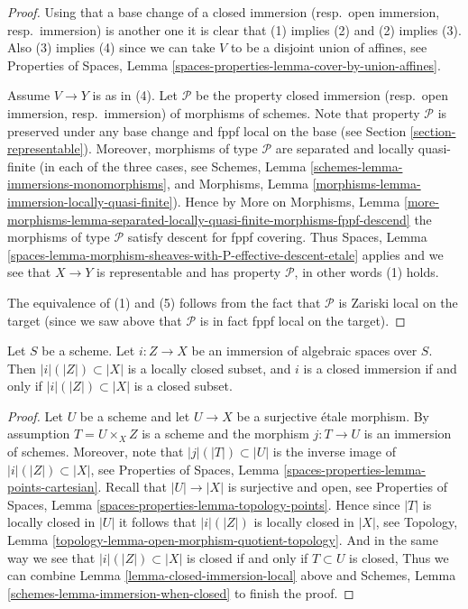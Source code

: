 \begin{proof}
Using that a base change of a
closed immersion (resp.\ open immersion, resp.\ immersion)
is another one it is clear that (1) implies (2) and (2) implies (3).
Also (3) implies (4) since we can take $V$ to be a disjoint union of
affines, see
Properties of Spaces,
Lemma \ref{spaces-properties-lemma-cover-by-union-affines}.

\medskip\noindent
Assume $V \to Y$ is as in (4).
Let $\mathcal{P}$ be the property
closed immersion (resp.\ open immersion, resp.\ immersion)
of morphisms of schemes. Note that property $\mathcal{P}$
is preserved under any base change and fppf local on the
base (see Section \ref{section-representable}).
Moreover, morphisms of type $\mathcal{P}$ are separated and
locally quasi-finite (in each of the three cases, see
Schemes, Lemma \ref{schemes-lemma-immersions-monomorphisms}, and
Morphisms, Lemma \ref{morphisms-lemma-immersion-locally-quasi-finite}).
Hence by
More on Morphisms, Lemma
\ref{more-morphisms-lemma-separated-locally-quasi-finite-morphisms-fppf-descend}
the morphisms of type $\mathcal{P}$ satisfy descent for fppf covering. Thus
Spaces, Lemma \ref{spaces-lemma-morphism-sheaves-with-P-effective-descent-etale}
applies and we see that $X \to Y$ is representable and has property
$\mathcal{P}$, in other words (1) holds.

\medskip\noindent
The equivalence of (1) and (5) follows from the fact that
$\mathcal{P}$ is Zariski local on the target (since we saw
above that $\mathcal{P}$ is in fact fppf local on the target).
\end{proof}

\begin{lemma}
\label{lemma-immersion-when-closed}
Let $S$ be a scheme. Let $i : Z \to X$ be an immersion of algebraic
spaces over $S$. Then $|i|(|Z|) \subset |X|$ is a locally closed subset,
and $i$ is a closed immersion if and only if
$|i|(|Z|) \subset |X|$ is a closed subset.
\end{lemma}

\begin{proof}
Let $U$ be a scheme and let $U \to X$ be a surjective \'etale morphism.
By assumption $T = U \times_X Z$ is a scheme and the morphism $j : T \to U$
is an immersion of schemes. Moreover, note that $|j|(|T|) \subset |U|$ is
the inverse image of $|i|(|Z|) \subset |X|$, see
Properties of Spaces, Lemma \ref{spaces-properties-lemma-points-cartesian}.
Recall that $|U| \to |X|$ is surjective and open, see
Properties of Spaces, Lemma \ref{spaces-properties-lemma-topology-points}.
Hence since $|T|$ is locally closed in $|U|$ it follows that
$|i|(|Z|)$ is locally closed in $|X|$, see
Topology, Lemma \ref{topology-lemma-open-morphism-quotient-topology}.
And in the same way we see that $|i|(|Z|) \subset |X|$ is closed if and only if
$T \subset U$ is closed, Thus we can combine
Lemma \ref{lemma-closed-immersion-local}
above and
Schemes, Lemma \ref{schemes-lemma-immersion-when-closed}
to finish the proof.
\end{proof}

